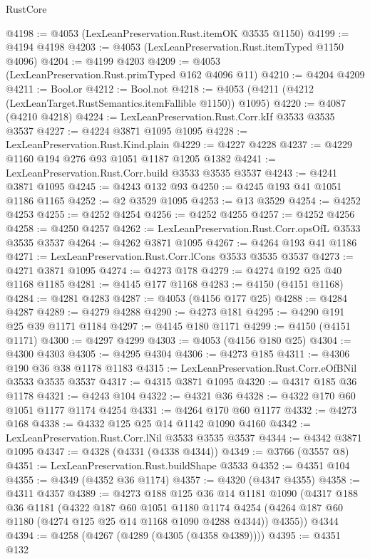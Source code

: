 \begin{lexlean}{RustCore}
\begin{coremodule}
@4198 := @4053 (LexLeanPreservation.Rust.itemOK @3535 @1150)
@4199 := @4194 @4198
@4203 := @4053 (LexLeanPreservation.Rust.itemTyped @1150 @4096)
@4204 := @4199 @4203
@4209 := @4053 (LexLeanPreservation.Rust.primTyped @162 @4096 @11)
@4210 := @4204 @4209
@4211 := Bool.or
@4212 := Bool.not
@4218 := @4053 (@4211 (@4212 (LexLeanTarget.RustSemantics.itemFallible @1150)) @1095)
@4220 := @4087 (@4210 @4218)
@4224 := LexLeanPreservation.Rust.Corr.kIf @3533 @3535 @3537
@4227 := @4224 @3871 @1095 @1095
@4228 := LexLeanPreservation.Rust.Kind.plain
@4229 := @4227 @4228
@4237 := @4229 @1160 @194 @276 @93 @1051 @1187 @1205 @1382
@4241 := LexLeanPreservation.Rust.Corr.build @3533 @3535 @3537
@4243 := @4241 @3871 @1095
@4245 := @4243 @132 @93
@4250 := @4245 @193 @41 @1051 @1186 @1165
@4252 := @2 @3529 @1095
@4253 := @13 @3529
@4254 := @4252 @4253
@4255 := @4252 @4254
@4256 := @4252 @4255
@4257 := @4252 @4256
@4258 := @4250 @4257
@4262 := LexLeanPreservation.Rust.Corr.opsOfL @3533 @3535 @3537
@4264 := @4262 @3871 @1095
@4267 := @4264 @193 @41 @1186
@4271 := LexLeanPreservation.Rust.Corr.lCons @3533 @3535 @3537
@4273 := @4271 @3871 @1095
@4274 := @4273 @178
@4279 := @4274 @192 @25 @40 @1168 @1185
@4281 := @4145 @177 @1168
@4283 := @4150 (@4151 @1168)
@4284 := @4281 @4283
@4287 := @4053 (@4156 @177 @25)
@4288 := @4284 @4287
@4289 := @4279 @4288
@4290 := @4273 @181
@4295 := @4290 @191 @25 @39 @1171 @1184
@4297 := @4145 @180 @1171
@4299 := @4150 (@4151 @1171)
@4300 := @4297 @4299
@4303 := @4053 (@4156 @180 @25)
@4304 := @4300 @4303
@4305 := @4295 @4304
@4306 := @4273 @185
@4311 := @4306 @190 @36 @38 @1178 @1183
@4315 := LexLeanPreservation.Rust.Corr.eOfBNil @3533 @3535 @3537
@4317 := @4315 @3871 @1095
@4320 := @4317 @185 @36 @1178
@4321 := @4243 @104
@4322 := @4321 @36
@4328 := @4322 @170 @60 @1051 @1177 @1174 @4254
@4331 := @4264 @170 @60 @1177
@4332 := @4273 @168
@4338 := @4332 @125 @25 @14 @1142 @1090 @4160
@4342 := LexLeanPreservation.Rust.Corr.lNil @3533 @3535 @3537
@4344 := @4342 @3871 @1095
@4347 := @4328 (@4331 (@4338 @4344))
@4349 := @3766 (@3557 @8)
@4351 := LexLeanPreservation.Rust.buildShape @3533
@4352 := @4351 @104
@4355 := @4349 (@4352 @36 @1174)
@4357 := @4320 (@4347 @4355)
@4358 := @4311 @4357
@4389 := @4273
    @188
    @125
    @36
    @14
    @1181
    @1090
    (@4317
      @188
      @36
      @1181
      (@4322
        @187
        @60
        @1051
        @1180
        @1174
        @4254
        (@4264 @187 @60 @1180 (@4274 @125 @25 @14 @1168 @1090 @4288 @4344))
        @4355))
    @4344
@4394 := @4258 (@4267 (@4289 (@4305 (@4358 @4389))))
@4395 := @4351 @132

\end{coremodule}
\end{lexlean}
